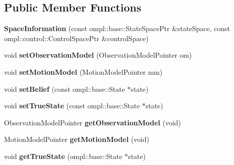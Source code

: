 \subsection*{\-Public \-Member \-Functions}
\begin{DoxyCompactItemize}
\item 
\hypertarget{classfirm_1_1_space_information_a18c0788b7b6a56993871f659c6426537}{{\bfseries \-Space\-Information} (const ompl\-::base\-::\-State\-Space\-Ptr \&state\-Space, const ompl\-::control\-::\-Control\-Space\-Ptr \&control\-Space)}\label{classfirm_1_1_space_information_a18c0788b7b6a56993871f659c6426537}

\item 
\hypertarget{classfirm_1_1_space_information_a06dd8787565e1771fbb5060104dc6644}{void {\bfseries set\-Observation\-Model} (\-Observation\-Model\-Pointer om)}\label{classfirm_1_1_space_information_a06dd8787565e1771fbb5060104dc6644}

\item 
\hypertarget{classfirm_1_1_space_information_a90164150ff2eb4e44325dccff69d08a2}{void {\bfseries set\-Motion\-Model} (\-Motion\-Model\-Pointer mm)}\label{classfirm_1_1_space_information_a90164150ff2eb4e44325dccff69d08a2}

\item 
\hypertarget{classfirm_1_1_space_information_a7555e2247318d5b37841816dc3c441b0}{void {\bfseries set\-Belief} (const ompl\-::base\-::\-State $\ast$state)}\label{classfirm_1_1_space_information_a7555e2247318d5b37841816dc3c441b0}

\item 
\hypertarget{classfirm_1_1_space_information_a9aa185374424a90241a1b971fc89aa4a}{void {\bfseries set\-True\-State} (const ompl\-::base\-::\-State $\ast$state)}\label{classfirm_1_1_space_information_a9aa185374424a90241a1b971fc89aa4a}

\item 
\hypertarget{classfirm_1_1_space_information_acdcc00f0bb5d74f66f0d3fb05b44ffb2}{\-Observation\-Model\-Pointer {\bfseries get\-Observation\-Model} (void)}\label{classfirm_1_1_space_information_acdcc00f0bb5d74f66f0d3fb05b44ffb2}

\item 
\hypertarget{classfirm_1_1_space_information_a38dfa45b21cec43a6577e422e19a44ee}{\-Motion\-Model\-Pointer {\bfseries get\-Motion\-Model} (void)}\label{classfirm_1_1_space_information_a38dfa45b21cec43a6577e422e19a44ee}

\item 
\hypertarget{classfirm_1_1_space_information_a99bd9e6ed38a4ace8e0e65063480baa9}{void {\bfseries get\-True\-State} (ompl\-::base\-::\-State $\ast$state)}\label{classfirm_1_1_space_information_a99bd9e6ed38a4ace8e0e65063480baa9}


\end{DoxyCompactItemize}
